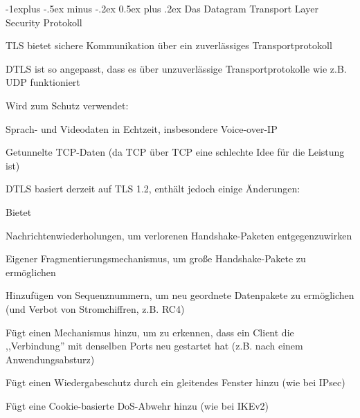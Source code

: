 \documentclass[a4paper]{article}
\makeatletter
\renewcommand{\subsection}{\@startsection{subsection}{2}{0mm}%
 {-1explus -.5ex minus -.2ex}%
 {0.5ex plus .2ex}%
 {\normalfont\normalsize\bfseries}}
\makeatother
\begin{document}
\begin{multicols}{3}
      \subsection{Das Datagram Transport Layer Security Protokoll}
      \begin{itemize*}
            \item TLS bietet sichere Kommunikation über ein zuverlässiges Transportprotokoll
            \item DTLS ist so angepasst, dass es über unzuverlässige Transportprotokolle wie z.B. UDP funktioniert
            \item Wird zum Schutz verwendet:
            \begin{itemize*}
                  \item Sprach- und Videodaten in Echtzeit, insbesondere Voice-over-IP
                  \item Getunnelte TCP-Daten (da TCP über TCP eine schlechte Idee für die Leistung ist)
            \end{itemize*}
            \item DTLS basiert derzeit auf TLS 1.2, enthält jedoch einige Änderungen:
            \begin{itemize*}
                  \item Bietet
                  \begin{itemize*}
                        \item Nachrichtenwiederholungen, um verlorenen Handshake-Paketen entgegenzuwirken
                        \item Eigener Fragmentierungsmechanismus, um große Handshake-Pakete zu ermöglichen
                  \end{itemize*}
                  \item Hinzufügen von Sequenznummern, um neu geordnete Datenpakete zu ermöglichen (und Verbot von Stromchiffren, z.B. RC4)
                  \item Fügt einen Mechanismus hinzu, um zu erkennen, dass ein Client die ,,Verbindung'' mit denselben Ports neu gestartet hat (z.B. nach einem Anwendungsabsturz)
                  \item Fügt einen Wiedergabeschutz durch ein gleitendes Fenster hinzu (wie bei IPsec)
                  \item Fügt eine Cookie-basierte DoS-Abwehr hinzu (wie bei IKEv2)
            \end{itemize*}
      \end{itemize*}


\end{multicols}
\end{document}
